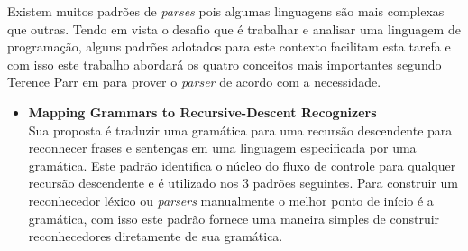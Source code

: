 Existem muitos padr\~{o}es de \textit{parses} pois algumas linguagens s\~{a}o mais complexas que outras. Tendo em vista o desafio que \'{e} trabalhar e analisar uma linguagem de programa\c{c}\~{a}o, alguns padr\~{o}es adotados para este contexto facilitam esta tarefa e com isso este trabalho abordar\'{a} os quatro conceitos  mais importantes segundo Terence Parr em \cite{Parr:2009:LIP:1823613} para prover o \textit{parser} de acordo com a necessidade.


\begin{itemize}
	\item \textbf{Mapping Grammars to Recursive-Descent Recognizers}\\
	Sua proposta \'{e} traduzir uma gram\'{a}tica para uma recurs\~{a}o descendente para reconhecer frases e senten\c{c}as em uma linguagem especificada por uma gram\'{a}tica. Este padr\~{a}o identifica o n\'{u}cleo do fluxo de controle para qualquer recurs\~{a}o descendente e \'{e} utilizado nos 3 padr\~{o}es seguintes. 
	Para construir um reconhecedor l\'{e}xico ou \textit{parsers} manualmente o melhor ponto de in\'{i}cio \'{e} a gram\'{a}tica, com isso este padr\~{a}o fornece uma maneira simples de construir reconhecedores diretamente de sua gram\'{a}tica.
	

\end{itemize}
